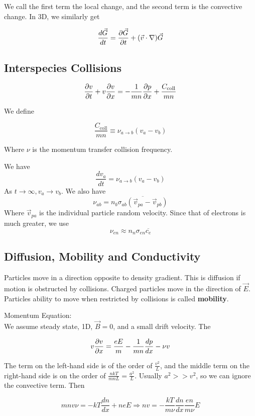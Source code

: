 \documentclass[12pt]{article}
\begin{document}
We call the first term the local change, and the second term is the convective change. In 3D, we similarly get

$$\frac{d\vec G}{dt} = \frac{\partial \vec G}{\partial t} + (\vec v  \cdot \nabla)\vec G$$

\subsection{Interspecies Collisions}

$$\frac{\partial v}{\partial t} + v\frac{\partial v}{\partial x} = -\frac{1}{mn} \frac{\partial p}{\partial x} + \frac{C_{\text{coll}}}{mn}$$

We define

$$\frac{C_{\text{coll}}}{mn} \equiv \nu_{a\rightarrow b} (v_a - v_b)$$

Where $\nu$ is the momentum transfer collision frequency.

\begin{ex}[$E = B = \del{}{x} = 0$]
    We have
    $$\frac{dv_a}{dt} = \nu_{a\rightarrow b}(v_a - v_b)$$
    As $t\rightarrow\infty, v_a \rightarrow v_b$.
    We also have
    $$\nu_{ab} = n_b \overline{\sigma_{ab}\left(\vec v_{pa} - \vec v_{pb}\right)}$$
    Where $\vec v_{pa}$ is the individual particle random velocity. Since that of electrons is much greater, we use
    $$\nu_{en} \approx n_n \sigma_{en}\overline{c_e}$$
\end{ex}

\subsection{Diffusion, Mobility and Conductivity}

Particles move in a direction opposite to density gradient. This is diffusion if motion is obstructed by collisions. Charged particles move in the direction of $\vec E$. Particles ability to move when restricted by collisions is called \textbf{mobility}.

Momentum Equation: \\
We assume steady state, 1D, $\vec B = 0$, and a small drift velocity. The

$$v\frac{\partial v}{\partial x} = \frac{eE}{m} - \frac{1}{mn} \frac{dp}{dx} - \nu v$$

The term on the left-hand side is of the order of $\frac{v^2}{L}$, and the middle term on the right-hand side is on the order of $\frac{nkT}{mnL} = \frac{a^2}{L}$. Usually $a^2 >> v^2$, so we can ignore the convective term. Then

$$mnv\nu = -kT \frac{dn}{dx} + neE \Rightarrow nv = -\frac{kT}{m\nu} \frac{dn}{dx} \frac{en}{m\nu}E$$
\end{document}

